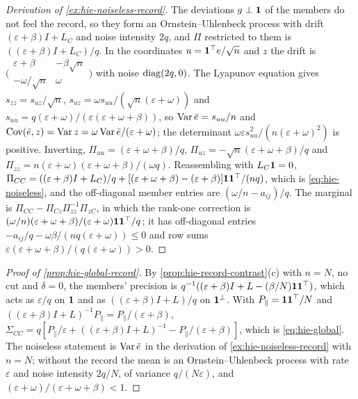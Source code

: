 \begin{proof}[Derivation of \cref{ex:hie-noiseless-record}]
The deviations $g\perp\mathbf{1}$ of the members do not feel the record, so they form an Ornstein--Uhlenbeck process with drift $(\varepsilon+\beta)I+L_C$ and noise intensity $2q$, and $\Pi$ restricted to them is $((\varepsilon+\beta)I+L_C)/q$. In the coordinates $u=\mathbf{1}^\top e/\sqrt n$ and $z$ the drift is $\bigl(\begin{smallmatrix}\varepsilon+\beta&-\beta\sqrt n\\-\omega/\sqrt n&\omega\end{smallmatrix}\bigr)$ with noise $\operatorname{diag}(2q,0)$. The Lyapunov equation gives $s_{zz}=s_{uz}/\sqrt n$, $s_{uz}=\omega s_{uu}/(\sqrt n(\varepsilon+\omega))$ and $s_{uu}=q(\varepsilon+\omega)/(\varepsilon(\varepsilon+\omega+\beta))$, so $\operatorname{Var}\bar e=s_{uu}/n$ and $\operatorname{Cov}(\bar e,z)=\operatorname{Var} z=\omega\operatorname{Var}\bar e/(\varepsilon+\omega)$; the determinant $\omega\varepsilon s_{uu}^2/(n(\varepsilon+\omega)^2)$ is positive. Inverting, $\Pi_{uu}=(\varepsilon+\omega+\beta)/q$, $\Pi_{uz}=-\sqrt n(\varepsilon+\omega+\beta)/q$ and $\Pi_{zz}=n(\varepsilon+\omega)(\varepsilon+\omega+\beta)/(\omega q)$. Reassembling with $L_C\mathbf{1}=0$, $\Pi_{CC}=((\varepsilon+\beta)I+L_C)/q+[(\varepsilon+\omega+\beta)-(\varepsilon+\beta)]\mathbf{1}\mathbf{1}^\top/(nq)$, which is \eqref{eq:hie-noiseless}, and the off-diagonal member entries are $(\omega/n-a_{ij})/q$. The marginal is $\Pi_{CC}-\Pi_{Cz}\Pi_{zz}^{-1}\Pi_{zC}$, in which the rank-one correction is $(\omega/n)(\varepsilon+\omega+\beta)/(\varepsilon+\omega)\mathbf{1}\mathbf{1}^\top/q$; it has off-diagonal entries $-a_{ij}/q-\omega\beta/(nq(\varepsilon+\omega))\le0$ and row sums $\varepsilon(\varepsilon+\omega+\beta)/(q(\varepsilon+\omega))>0$.
\end{proof}

\begin{proof}[Proof of \cref{prop:hie-global-record}]
By \cref{prop:hie-record-contrast}(c) with $n=N$, no cut and $\delta=0$, the members' precision is $q^{-1}((\varepsilon+\beta)I+L-(\beta/N)\mathbf{1}\mathbf{1}^\top)$, which acts as $\varepsilon/q$ on $\mathbf{1}$ and as $((\varepsilon+\beta)I+L)/q$ on $\mathbf{1}^\perp$. With $P_\parallel=\mathbf{1}\mathbf{1}^\top/N$ and $((\varepsilon+\beta)I+L)^{-1}P_\parallel=P_\parallel/(\varepsilon+\beta)$, $\Sigma_{CC}=q[P_\parallel/\varepsilon+((\varepsilon+\beta)I+L)^{-1}-P_\parallel/(\varepsilon+\beta)]$, which is \eqref{eq:hie-global}. The noiseless statement is $\operatorname{Var}\bar e$ in the derivation of \cref{ex:hie-noiseless-record} with $n=N$; without the record the mean is an Ornstein--Uhlenbeck process with rate $\varepsilon$ and noise intensity $2q/N$, of variance $q/(N\varepsilon)$, and $(\varepsilon+\omega)/(\varepsilon+\omega+\beta)<1$.
\end{proof}


